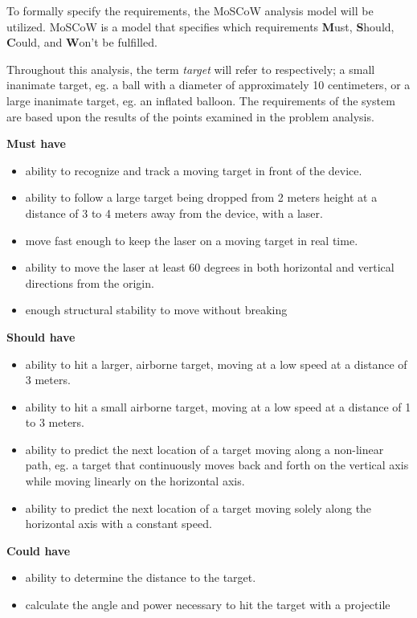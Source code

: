 To formally specify the requirements, the MoSCoW analysis model will be utilized.
MoSCoW is a model that specifies which requirements \textbf{M}ust, \textbf{S}hould, \textbf{C}ould, and \textbf{W}on't be fulfilled.

Throughout this analysis, the term \textit{target} will refer to respectively; a small inanimate target, eg{.} a ball with a diameter of approximately 10 centimeters, or a large inanimate target, eg{.} an inflated balloon.
The requirements of the system are based upon the results of the points examined in the problem analysis.

\textbf{Must have}
\begin{itemize}
	\item ability to recognize and track a moving target in front of the device.
	\item ability to follow a large target being dropped from 2 meters height at a distance of 3 to 4 meters away from the device, with a laser.
	\item move fast enough to keep the laser on a moving target in real time.
	\item ability to move the laser at least 60 degrees in both horizontal and vertical directions from the origin.
	\item enough structural stability to move without breaking
\end{itemize}

\textbf{Should have}
\begin{itemize}
	\item ability to hit a larger, airborne target, moving at a low speed at a distance of 3 meters.
	\item ability to hit a small airborne target, moving at a low speed at a distance of 1 to 3 meters.
	\item ability to predict the next location of a target moving along a non-linear path, eg{.} a target that continuously moves back and forth on the vertical axis while moving linearly on the horizontal axis.
	\item ability to predict the next location of a target moving solely along the horizontal axis with a constant speed.
\end{itemize}

\textbf{Could have}
\begin{itemize}
	\item ability to determine the distance to the target.
	\item calculate the angle and power necessary to hit the target with a projectile
\end{itemize}

